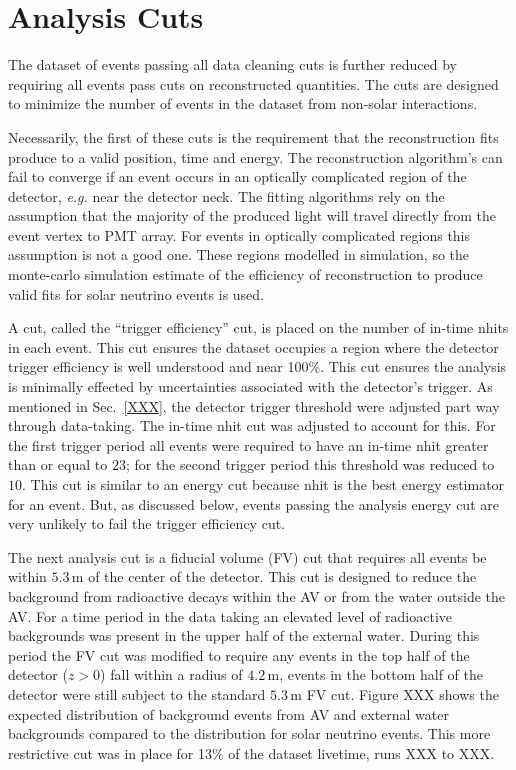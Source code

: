 \section{Analysis Cuts}
The dataset of events passing all data cleaning cuts is further reduced by
requiring all events pass cuts on reconstructed quantities.
The cuts are designed to minimize the number of events in the dataset from
non-solar interactions.

Necessarily, the first of these cuts is the requirement that the reconstruction
fits produce to a valid position, time and energy.
The reconstruction algorithm's can fail to converge if an event occurs in an
optically complicated region of the detector, \textit{e.g.} near the detector
neck. The fitting algorithms rely on the assumption that the majority of
the produced light will travel directly from the event vertex to PMT array.
For events in optically complicated regions this assumption is not a good one.
These regions modelled in simulation, so the monte-carlo simulation estimate of
the efficiency of reconstruction to produce valid fits for solar neutrino events
is used.

A cut, called the ``trigger efficiency'' cut,  is placed on the number of
in-time nhits in each event.
This cut ensures the dataset occupies a region where the detector trigger
efficiency is well understood and near 100\%.
This cut ensures the analysis is minimally effected by uncertainties
associated with the detector's trigger.
As mentioned in Sec.~\ref{XXX}, the detector trigger threshold were adjusted
part way through data-taking. The in-time nhit cut was adjusted to
account for this.
For the first trigger period all events were required to have an in-time
nhit greater than or equal to $23$; for the second trigger period this
threshold was reduced to $10$.
This cut is similar to an energy cut because nhit is the best energy estimator
for an event. But, as discussed below, events passing the analysis energy cut
are very unlikely to fail the trigger efficiency cut.

The next analysis cut is a fiducial volume (FV) cut that requires all events
be within $5.3$\,m of the center of the detector.
This cut is designed to reduce the background from radioactive decays within
the AV or from the water outside the AV\@.
For a time period in the data taking an elevated level of radioactive
backgrounds was present in the upper half of the external water.
During this period the FV cut was modified to require any events in the
top half of the detector ($z > 0$) fall within a radius of $4.2$\,m,
events in the bottom half of the detector were still subject to the standard
$5.3$\,m FV cut.
Figure {XXX} shows the expected distribution of background events from
AV and external water backgrounds compared to the distribution for solar neutrino
events. This more restrictive cut was in place for 13\% of the dataset livetime,
runs XXX to XXX\@.

